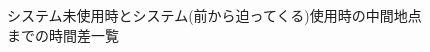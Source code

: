 \begin{figure}[H]
    \centering
    \caption{システム未使用時とシステム(前から迫ってくる)使用時の中間地点までの時間差一覧}
    \label{fig:maehalf}
\end{figure}
